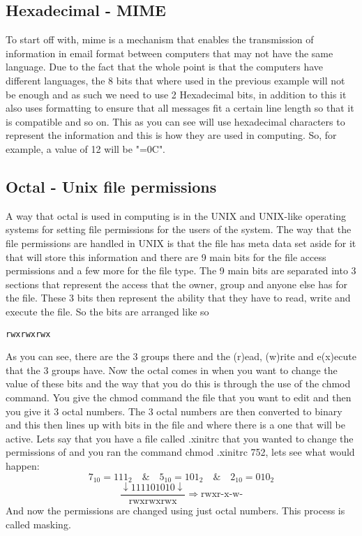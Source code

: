 \documentclass{article}
\begin{document}
\subsection{Hexadecimal - MIME}
To start off with, mime is a mechanism that enables the transmission of information in email format between computers that may not have the same language. Due to the fact that the whole point is that the computers have different languages, the 8 bits that where used in the previous example will not be enough and as such we need to use 2 Hexadecimal bits, in addition to this it also uses formatting to ensure that all messages fit a certain line length so that it is compatible and so on. This as you can see will use hexadecimal characters to represent the information and this is how they are used in computing. So, for example, a value of 12 will be "=0C". 
\subsection{Octal - Unix file permissions}
A way that octal is used in computing is in the UNIX and UNIX-like operating systems for setting file permissions for the users of the system. The way that the file permissions are handled in UNIX is that the file has meta data set aside for it that will store this information and there are 9 main bits for the file access permissions and a few more for the file type. The 9 main bits are separated into 3 sections that represent the access that the owner, group and anyone else has for the file. These 3 bits then represent the ability that they have to read, write and execute the file. So the bits are arranged like so
\begin{verbatim}
rwxrwxrwx
\end{verbatim}
As you can see, there are the 3 groups there and the (r)ead, (w)rite and e(x)ecute that the 3 groups have. Now the octal comes in when you want to change the value of these bits and the way that you do this is through the use of the chmod command. You give the chmod command the file that you want to edit and then you give it 3 octal numbers. The 3 octal numbers are then converted to binary and this then lines up with bits in the file and where there is a one that will be active. Lets say that you have a file called .xinitrc that you wanted to change the permissions of and you ran the command chmod .xinitrc 752, lets see what would happen:
\[
	7_{10} = 111_{2} \quad \& \quad 5_{10} = 101_{2} \quad \& \quad 2_{10} = 010_{2}
\]
\[
	\frac{\downarrow111101010\downarrow}{\mbox{rwxrwxrwx}} \Rightarrow \mbox{rwxr-x-w-}
\]
And now the permissions are changed using just octal numbers. This process is called masking. 
\end{document}
